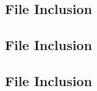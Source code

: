 \documentclass[11pt]{article}
\newcommand{\Verilog}[2][]{%
	
}
\begin{document}
\subsection*{File Inclusion}
\Verilog[caption=anode decoder Verilog code,label=code:file_ex]{alu.sv}

\subsection*{File Inclusion}
\Verilog[caption=anode decoder Test Benches Verilog code,label=code:file_ex]{alu_test.sv}


\subsection*{File Inclusion}
\Verilog[caption=sseg4 Verilog code,label=code:file_ex]{top_lab9.sv}
\end{document}
